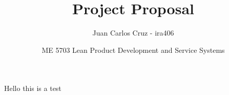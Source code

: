 \documentclass{article}
\title{Project Proposal}
\author{Juan Carlos Cruz - ira406}
\date{ME 5703 Lean Product Development and Service Systems}
\begin{document}
	\maketitle
	\noindent%

    Hello this is a test


	\newpage
	
	\nocite{*}
	
\end{document}
